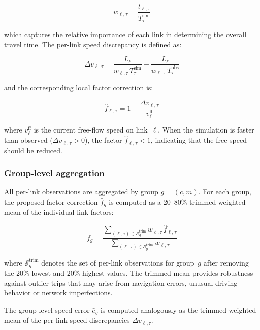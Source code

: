 \begin{equation}
    w_{\ell,\tau} = \frac{t_{\ell,\tau}}{T_\tau^{\text{sim}}}
    \label{eq:link_weight}
\end{equation}

\noindent which captures the relative importance of each link in determining the overall travel time. The per-link speed discrepancy is defined as:

\begin{equation}
    \Delta v_{\ell,\tau} = \frac{L_\ell}{w_{\ell,\tau} \, T_\tau^{\text{sim}}} - \frac{L_\ell}{w_{\ell,\tau} \, T_\tau^{\text{obs}}}
    \label{eq:speed_diff}
\end{equation}

\noindent and the corresponding local factor correction is:

\begin{equation}
    \hat{f}_{\ell,\tau} = 1 - \frac{\Delta v_{\ell,\tau}}{v_\ell^{\text{ff}}}
    \label{eq:local_factor}
\end{equation}

\noindent where $v_\ell^{\text{ff}}$ is the current free-flow speed on link~$\ell$. When the simulation is faster than observed ($\Delta v_{\ell,\tau} > 0$), the factor $\hat{f}_{\ell,\tau} < 1$, indicating that the free speed should be reduced.

\subsubsection{Group-level aggregation}

All per-link observations are aggregated by group $g = (c, m)$. For each group, the proposed factor correction $\bar{f}_g$ is computed as a 20--80\% trimmed weighted mean of the individual link factors:

\begin{equation}
    \bar{f}_g = \frac{\sum_{(\ell,\tau) \in \mathcal{S}_g^{\text{trim}}} w_{\ell,\tau} \, \hat{f}_{\ell,\tau}}{\sum_{(\ell,\tau) \in \mathcal{S}_g^{\text{trim}}} w_{\ell,\tau}}
    \label{eq:trimmed_factor}
\end{equation}

\noindent where $\mathcal{S}_g^{\text{trim}}$ denotes the set of per-link observations for group~$g$ after removing the 20\% lowest and 20\% highest values. The trimmed mean provides robustness against outlier trips that may arise from navigation errors, unusual driving behavior or network imperfections.

The group-level speed error $\bar{e}_g$ is computed analogously as the trimmed weighted mean of the per-link speed discrepancies $\Delta v_{\ell,\tau}$.

